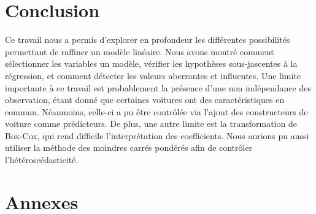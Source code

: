\documentclass[11pt,a4paper]{article}
\begin{document}
\section{Conclusion}
Ce travail nous a permis d'explorer en profondeur les différentes possibilités permettant de raffiner un modèle linéaire. Nous avons montré comment sélectionner les variables un modèle, vérifier les hypothèses sous-jascentes à la régression, et comment détecter les valeurs aberrantes et influentes. Une limite importante à ce travail est probablement la présence d'une non indépendance des observation, étant donné que certaines voitures ont des caractéristiques en commun. Néanmoins, celle-ci a pu être contrôlée via l'ajout des constructeurs de voiture comme prédicteurs. De plus, une autre limite est la transformation de Box-Cox, qui rend difficile l'interprétation des coefficients. Nous aurions pu aussi utiliser la méthode des moindres carrés pondérés afin de contrôler l'hétéroscédasticité.
\newpage
\FloatBarrier
\section{Annexes}
\appendix
\end{document}

